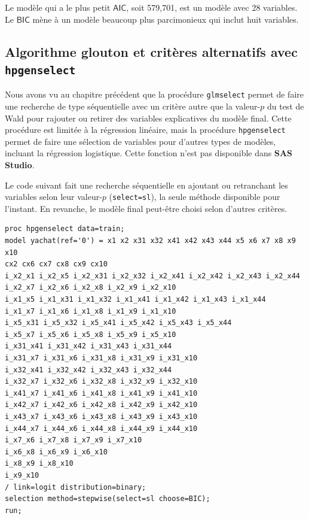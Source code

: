 \documentclass[
  11pt,
  letterpaper,
]{book}
\theoremstyle{definition}
\theoremstyle{definition}
\theoremstyle{definition}
\theoremstyle{remark}
\begin{document}
Le modèle qui a le plus petit \(\mathsf{AIC}\), soit 579,701, est un modèle avec 28 variables. Le \(\mathsf{BIC}\) mène à un modèle beaucoup plus parcimonieux qui inclut huit variables.

\hypertarget{algorithme-glouton-et-crituxe8res-alternatifs-avec-hpgenselect}{%
\subsection{\texorpdfstring{Algorithme glouton et critères alternatifs avec \texttt{hpgenselect}}{Algorithme glouton et critères alternatifs avec hpgenselect}}\label{algorithme-glouton-et-crituxe8res-alternatifs-avec-hpgenselect}}

Nous avons vu au chapitre précédent que la procédure \texttt{glmselect} permet de faire une recherche de type séquentielle avec un critère autre que la valeur-\(p\) du test de Wald pour rajouter ou retirer des variables explicatives du modèle final. Cette procédure est limitée à la régression linéaire, mais la procédure \texttt{hpgenselect} permet de faire une sélection de variables pour d'autres types de modèles, incluant la régression logistique. Cette fonction n'est pas disponible dans \textbf{SAS Studio}.

Le code suivant fait une recherche séquentielle en ajoutant ou retranchant les variables selon leur valeur-\(p\) (\texttt{select=sl}), la seule méthode disponible pour l'instant. En revanche, le modèle final peut-être choisi selon d'autres critères.

\begin{verbatim}
proc hpgenselect data=train;
model yachat(ref='0') = x1 x2 x31 x32 x41 x42 x43 x44 x5 x6 x7 x8 x9 x10
cx2 cx6 cx7 cx8 cx9 cx10
i_x2_x1 i_x2_x5 i_x2_x31 i_x2_x32 i_x2_x41 i_x2_x42 i_x2_x43 i_x2_x44
i_x2_x7 i_x2_x6 i_x2_x8 i_x2_x9 i_x2_x10
i_x1_x5 i_x1_x31 i_x1_x32 i_x1_x41 i_x1_x42 i_x1_x43 i_x1_x44
i_x1_x7 i_x1_x6 i_x1_x8 i_x1_x9 i_x1_x10
i_x5_x31 i_x5_x32 i_x5_x41 i_x5_x42 i_x5_x43 i_x5_x44
i_x5_x7 i_x5_x6 i_x5_x8 i_x5_x9 i_x5_x10
i_x31_x41 i_x31_x42 i_x31_x43 i_x31_x44
i_x31_x7 i_x31_x6 i_x31_x8 i_x31_x9 i_x31_x10
i_x32_x41 i_x32_x42 i_x32_x43 i_x32_x44
i_x32_x7 i_x32_x6 i_x32_x8 i_x32_x9 i_x32_x10
i_x41_x7 i_x41_x6 i_x41_x8 i_x41_x9 i_x41_x10
i_x42_x7 i_x42_x6 i_x42_x8 i_x42_x9 i_x42_x10
i_x43_x7 i_x43_x6 i_x43_x8 i_x43_x9 i_x43_x10
i_x44_x7 i_x44_x6 i_x44_x8 i_x44_x9 i_x44_x10
i_x7_x6 i_x7_x8 i_x7_x9 i_x7_x10
i_x6_x8 i_x6_x9 i_x6_x10
i_x8_x9 i_x8_x10
i_x9_x10 
/ link=logit distribution=binary;
selection method=stepwise(select=sl choose=BIC);
run;
\end{verbatim}
\end{document}
